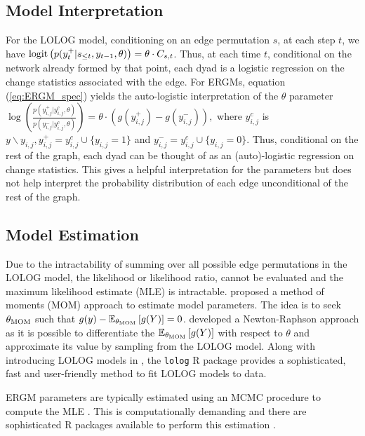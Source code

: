\documentclass[
]{statsoc}
\begin{document}
\subsection{Model Interpretation}

For the LOLOG model, conditioning on an edge permutation \(s\), at each
step \(t\), we have
\({\rm logit}\left( {p(y_{t}^{+} \vert s_{\leq t}, y_{t-1}, \theta )}\right) = \theta\cdot C_{s,t}\).
Thus, at each time \(t\), conditional on the network already formed by
that point, each dyad is a logistic regression on the change statistics
associated with the edge. For ERGMs, equation (\ref{eq:ERGM_spec})
yields the auto-logistic interpretation of the \(\theta\) parameter
\(\log\left(\frac{p(y_{i,j}^{+} \vert y_{i,j}^{c}, \theta )}{p(y_{i,j}^{-} \vert y_{i,j}^{c}, \theta )}\right) = \theta\cdot (g(y_{i,j}^{+}) - g(y_{i,j}^{-})),\)
where \(y_{i,j}^{c}\) is
\(y{\backslash}y_{i,j}, y_{i,j}^{+}=y_{i,j}^{c}\cup\{y_{i,j}=1\}\) and
\(y_{i,j}^{-} = y_{i,j}^{c}\cup\{y_{i,j}=0\}\). Thus, conditional on the
rest of the graph, each dyad can be thought of as an (auto)-logistic
regression on change statistics. This gives a helpful interpretation for
the parameters but does not help interpret the probability distribution
of each edge unconditional of the rest of the graph.

\subsection{Model Estimation}

Due to the intractability of summing over all possible edge permutations
in the LOLOG model, the likelihood or likelihood ratio, cannot be
evaluated and the maximum likelihood estimate (MLE) is intractable.
\cite{Fellows2018} proposed a method of moments (MOM) approach to
estimate model parameters. The idea is to seek \(\theta_{{\rm MOM}}\)
such that
\(g(y) - \mathbb{E}_{\theta_{{\rm MOM}}}\left[ g(Y) \right] = 0\).
\cite{Fellows2018} developed a Newton-Raphson approach as it is possible
to differentiate the
\(\mathbb{E}_{\theta_{{\rm MOM}}}\left[ g(Y) \right]\) with respect to
\(\theta\) and approximate its value by sampling from the LOLOG model.
Along with introducing LOLOG models in \cite{Fellows2018}, the
\texttt{lolog} R package \citep{LOLOG_github} provides a sophisticated,
fast and user-friendly method to fit LOLOG models to data.

ERGM parameters are typically estimated using an MCMC procedure to
compute the MLE \citep{Snijders2002,Hunter2006}. This is computationally
demanding and there are sophisticated R packages available to perform
this estimation \citep{ergm_3_9_4}.
\end{document}
